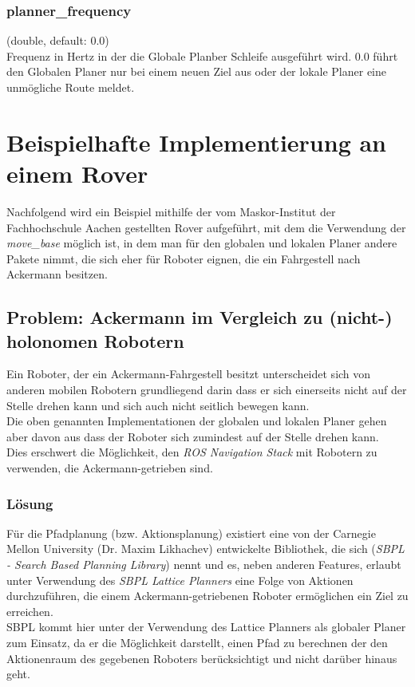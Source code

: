 \documentclass[oribibl]{llncs}
\begin{document}
\subsubsection{planner\_frequency} (double, default: 0.0)\\
	Frequenz in Hertz in der die Globale Planber Schleife ausgeführt wird.
	0.0 führt den Globalen Planer nur bei einem neuen Ziel aus oder der lokale Planer eine unmögliche Route meldet.	
\newpage
\section{Beispielhafte Implementierung an einem Rover}
Nachfolgend wird ein Beispiel mithilfe der vom Maskor-Institut der Fachhochschule Aachen gestellten Rover aufgeführt, mit dem die Verwendung der \textit{move\_base} möglich ist, in dem man für den globalen und lokalen Planer andere Pakete nimmt, die sich eher für Roboter eignen, die ein Fahrgestell nach Ackermann besitzen.\\
\subsection{Problem: Ackermann im Vergleich zu (nicht-) holonomen Robotern}
Ein Roboter, der ein Ackermann-Fahrgestell besitzt unterscheidet sich von anderen mobilen Robotern grundliegend darin dass er sich einerseits nicht auf der Stelle drehen kann und sich auch nicht seitlich bewegen kann.\\
Die oben genannten Implementationen der globalen und lokalen Planer gehen aber davon aus dass der Roboter sich zumindest auf der Stelle drehen kann.\\
Dies erschwert die Möglichkeit, den \textit{ROS Navigation Stack} mit Robotern zu verwenden, die Ackermann-getrieben sind.\cite{ackermannGroup}
\subsubsection{Lösung}
Für die Pfadplanung (bzw. Aktionsplanung) existiert eine von der Carnegie Mellon University (Dr. Maxim Likhachev\cite{likhachev}) entwickelte Bibliothek, die sich (\textit{SBPL - Search Based Planning Library})\cite{sbplMain} nennt und es, neben anderen Features, erlaubt unter Verwendung des \textit{SBPL Lattice Planners} eine Folge von Aktionen durchzuführen, die einem Ackermann-getriebenen Roboter ermöglichen ein Ziel zu erreichen.\\
SBPL kommt hier unter der Verwendung des Lattice Planners als globaler Planer zum Einsatz, da er die Möglichkeit darstellt, einen Pfad zu berechnen der den Aktionenraum des gegebenen Roboters berücksichtigt und nicht darüber hinaus geht.
\end{document}
